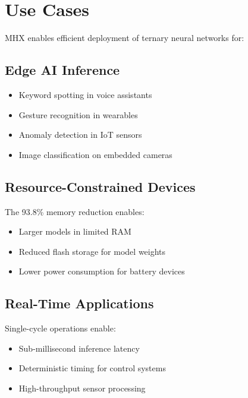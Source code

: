 \documentclass[conference,10pt]{IEEEtran}
\newcommand{\mhx}{\textsc{MHX\texttrademark}}
\begin{document}
\section{Use Cases}
\label{sec:usecases}

\mhx{} enables efficient deployment of ternary neural networks for:

\subsection{Edge AI Inference}

\begin{itemize}
    \item Keyword spotting in voice assistants
    \item Gesture recognition in wearables
    \item Anomaly detection in IoT sensors
    \item Image classification on embedded cameras
\end{itemize}

\subsection{Resource-Constrained Devices}

The 93.8\% memory reduction enables:
\begin{itemize}
    \item Larger models in limited RAM
    \item Reduced flash storage for model weights
    \item Lower power consumption for battery devices
\end{itemize}

\subsection{Real-Time Applications}

Single-cycle operations enable:
\begin{itemize}
    \item Sub-millisecond inference latency
    \item Deterministic timing for control systems
    \item High-throughput sensor processing
\end{itemize}
\end{document}
